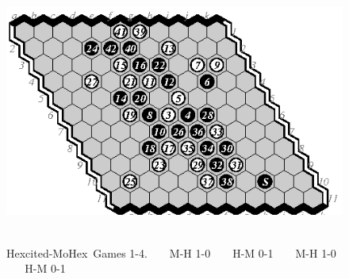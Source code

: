 \documentclass{icga}
\def\Hite{\mbox{\sc Hexcited}}
\def\Mx{\mbox{\sc MoHex}}
\begin{document}
\begin{figure}[hbp]
\includegraphics[scale=.8]{pix/11.hm4.eps}\hspace*{-1.5cm}\
\caption{\Hite-\Mx\ Games 1-4. ~ ~ M-H 1-0 ~ ~ H-M 0-1 ~ ~ M-H 1-0 ~ ~ H-M 0-1}
\end{figure}
\end{document}
